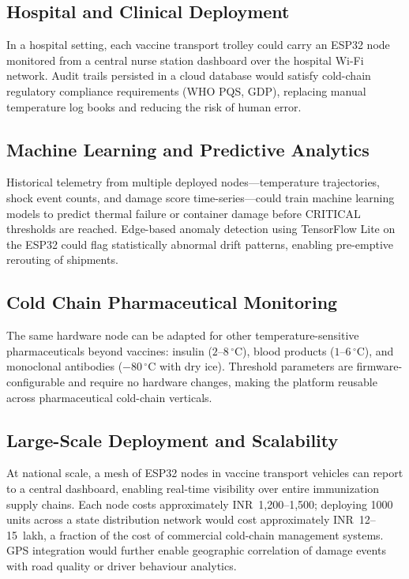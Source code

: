 \documentclass[12pt, a4paper]{article}
\begin{document}
\subsection{Hospital and Clinical Deployment}

In a hospital setting, each vaccine transport trolley could carry an ESP32 node monitored from a central nurse station dashboard over the hospital Wi-Fi network. Audit trails persisted in a cloud database would satisfy cold-chain regulatory compliance requirements (WHO PQS, GDP), replacing manual temperature log books and reducing the risk of human error.

\subsection{Machine Learning and Predictive Analytics}

Historical telemetry from multiple deployed nodes—temperature trajectories, shock event counts, and damage score time-series—could train machine learning models to predict thermal failure or container damage before CRITICAL thresholds are reached. Edge-based anomaly detection using TensorFlow Lite on the ESP32 could flag statistically abnormal drift patterns, enabling pre-emptive rerouting of shipments.

\subsection{Cold Chain Pharmaceutical Monitoring}

The same hardware node can be adapted for other temperature-sensitive pharmaceuticals beyond vaccines: insulin ($2$--$8\,^\circ$C), blood products ($1$--$6\,^\circ$C), and monoclonal antibodies ($-80\,^\circ$C with dry ice). Threshold parameters are firmware-configurable and require no hardware changes, making the platform reusable across pharmaceutical cold-chain verticals.

\subsection{Large-Scale Deployment and Scalability}

At national scale, a mesh of ESP32 nodes in vaccine transport vehicles can report to a central dashboard, enabling real-time visibility over entire immunization supply chains. Each node costs approximately INR~1,200--1,500; deploying 1000 units across a state distribution network would cost approximately INR~12--15~lakh, a fraction of the cost of commercial cold-chain management systems. GPS integration would further enable geographic correlation of damage events with road quality or driver behaviour analytics.
\end{document}
